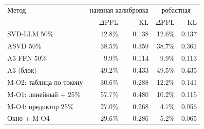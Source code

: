 \begin{tabular}{lrrrr}
\toprule
Метод & \multicolumn{2}{c}{наивная калибровка} & \multicolumn{2}{c}{робастная} \\
 & $\Delta$PPL & KL & $\Delta$PPL & KL \\
\midrule
SVD-LLM 50\% & 12.8\% & 0.138 & 12.6\% & 0.137 \\
ASVD 50\% & 38.5\% & 0.359 & 38.7\% & 0.361 \\
A3 FFN 50\% & 9.9\% & 0.114 & 9.9\% & 0.113 \\
A3 (блок) & 49.2\% & 0.433 & 49.5\% & 0.435 \\
M-O2: таблица по токену & 30.6\% & 0.288 & 12.2\% & 0.141 \\
M-O1: линейный + 25\% & 57.7\% & 0.480 & 10.2\% & 0.115 \\
M-O4: предиктор 25\% & 27.0\% & 0.268 & 4.7\% & 0.056 \\
Окно + M-O4 & 29.6\% & 0.286 & 5.2\% & 0.065 \\
\bottomrule
\end{tabular}
